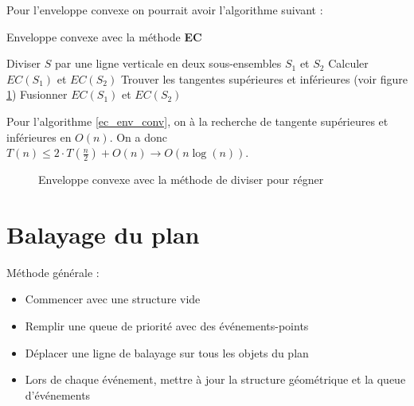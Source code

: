 \documentclass[11pt,a4paper]{report}
\begin{document}
Pour l'enveloppe convexe on pourrait avoir l'algorithme suivant :

\begin{algorithm}[H]
\caption{Enveloppe convexe avec la méthode \textbf{EC}}
\label{ec_env_conv}
Diviser $S$ par une ligne verticale en deux sous-ensembles $S_1$ et $S_2$\;
Calculer $EC(S_1)$ et $EC(S_2)$\;
Trouver les tangentes supérieures et inférieures (voir figure \ref{fig:ec_env_conv})\;
Fusionner $EC(S_1)$ et $EC(S_2)$\;
\end{algorithm}

Pour l'algorithme \ref{ec_env_conv}, on à la recherche de tangente supérieures et inférieures en $O(n)$. On a donc $T(n) \leq 2\cdot T(\frac{n}{2}) + O(n) \rightarrow O(n \log(n))$.

\begin{figure}
    \centering
    \caption{Enveloppe convexe avec la méthode de diviser pour régner}
    \label{fig:ec_env_conv}
\end{figure}

\section{Balayage du plan}

Méthode générale :
\begin{itemize}
    \item Commencer avec une structure vide
    \item Remplir une queue de priorité avec des événements-points
    \item Déplacer une ligne de balayage sur tous les objets du plan
    \item Lors de chaque événement, mettre à jour la structure géométrique et la queue d'évé\-nements
\end{itemize}
\end{document}
